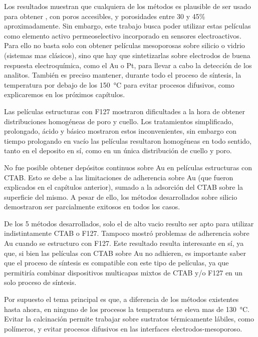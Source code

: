 {	Los resultados muestran que cualquiera de los métodos es plausible de ser usado para obtener \pdm, con poros accesibles, y porosidades entre 30 y 45\% aproximadamente. Sin embargo, este trabajo busca poder utilizar estas películas como elemento activo permeoselectivo incorporado en sensores electroactivos. Para ello no basta solo con obtener películas mesoporosas sobre silicio o vidrio (sistemas mas clásicos), sino que hay que sintetizarlas sobre electrodos de buena respuesta electroquímica, como el Au o Pt, para llevar a cabo la detección de los analitos. También es preciso mantener, durante todo el proceso de síntesis, la temperatura por debajo de los \SI{150}{\celsius} para evitar procesos difusivos, como explicaremos en los próximos capítulos.

	Las películas estructuras con F127 mostraron dificultades a la hora de obtener distribuciones homogéneas de poro y cuello. Los tratamientos simplificado, prolongado, ácido y básico mostraron estos inconvenientes, sin embargo con tiempo prologando en vacío las películas resultaron homogéneas en todo sentido, tanto en el deposito en sí, como en un única distribución de cuello y poro. 

	No fue posible obtener depósitos continuos sobre Au en películas estructuras con CTAB. Esto se debe a las limitaciones de adherencia sobre Au (que fueron explicados en el capítulos anterior), sumado a la adsorción del CTAB sobre la superficie del mismo. A pesar de ello, los métodos desarrollados sobre silicio demostraron ser parcialmente exitosos en todos los casos.

	De los 5 métodos desarrollados, solo el de alto vacio resulto ser apto para utilizar indistintamente CTAB o F127. Tampoco mostró problemas de adherencia sobre Au cuando se estructuro con F127. Este resultado resulta interesante en sí, ya que, si bien las películas con CTAB sobre Au no adhieren, es importante saber que el proceso de síntesis es compatible con este tipo de películas, ya que permitiría combinar dispositivos multicapas mixtos de CTAB y/o F127 en un solo proceso de síntesis.

	Por supuesto el tema principal es que, a diferencia de los métodos existentes hasta ahora, en ninguno de los procesos la temperatura se eleva mas de \SI{130}{\celsius}. Evitar la calcinación permite trabajar sobre sustratos térmicamente lábiles, como polímeros, y evitar procesos difusivos en las interfaces electrodos-mesoporoso. 

}
